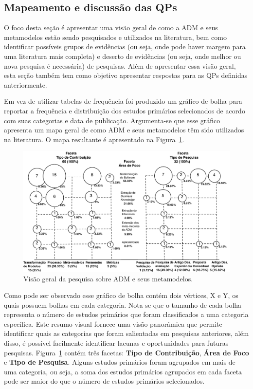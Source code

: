 \subsection{Mapeamento e discussão das QPs}

O foco desta seção é apresentar uma visão geral de como a ADM e seus metamodelos estão sendo pesquisados e utilizados na literatura, bem como identificar possíveis grupos de evidências (ou seja, onde pode haver margem para uma literatura mais completa) e deserto de evidências (ou seja, onde melhor ou nova pesquisa é necessária) de pesquisas. Além de apresentar essa visão geral, esta seção também tem como objetivo apresentar respostas para as QPs definidas anteriormente.

Em vez de utilizar tabelas de frequência foi produzido um gráfico de bolha para reportar a frequência e distribuição dos estudos primários selecionados de acordo com suas categorias e data de publicação. Argumenta-se que esse gráfico apresenta um mapa geral de como ADM e seus metamodelos têm sido utilizados na literatura. O mapa resultante é apresentado na Figura~\ref{fig:mapa_mapeamento_sistematico}.


\begin{figure}[h]
 \caption{Visão geral da pesquisa sobre ADM e seus metamodelos.}
 \label{fig:mapa_mapeamento_sistematico}
 \centering
 \includegraphics[scale=0.8]{images/MapaMS_port}
 \fautor
\end{figure}

Como pode ser observado esse gráfico de bolha contém dois vértices, X e Y, os quais possuem bolhas em cada categoria. Nota-se que o tamanho de cada bolha representa o número de estudos primários que foram classificados a uma categoria específica. Este resumo visual fornece uma visão panorâmica que permite identificar quais as categorias que foram salientadas em pesquisas anteriores, além disso, é possível facilmente identificar lacunas e oportunidades para futuras pesquisas. Figura~\ref{fig:mapa_mapeamento_sistematico} contém três facetas: \textbf{Tipo de Contribuição}, \textbf{Área de Foco} e \textbf{Tipo de Pesquisa}. Alguns estudos primários foram agrupados em mais de uma categoria, ou seja, a soma dos estudos primários agrupados em cada faceta pode ser maior do que o número de estudos primários selecionados.

